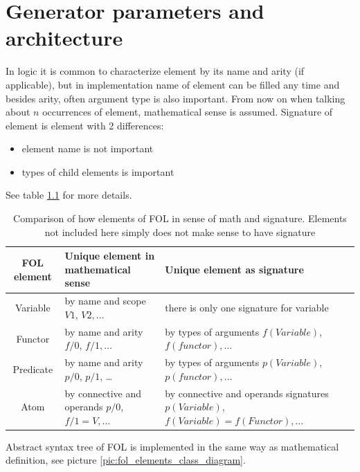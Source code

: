 \chapter{Generator parameters and architecture}

In logic it is common to characterize element by its name and arity (if applicable), but in implementation name of element can be filled any time and besides arity, often argument type is also important. From now on when talking about $n$ occurrences of element, mathematical sense is assumed. Signature of element is element with 2 differences:

\begin{itemize}
  \item element name is not important
  \item types of child elements is important 
\end{itemize}

See table \ref{tab:signatureComparison} for more details.

\begin{table}
  \centering
  \footnotesize
  \begin{tabularx}{\textwidth}{|c|X|X|}
    \hline
    FOL element & Unique element in mathematical sense & Unique element as signature \\
    \hline
    Variable & by name and scope $V1$, $V2, \dots$ & there is only one signature for variable \\  
    \hline
    Functor & by name and arity $f/0$, $f/1, \dots$ & by types of arguments $f(Variable)$, $f(functor), \dots$ \\
    \hline
    Predicate & by name and arity $p/0$, $p/1$, \dots & by types of arguments $p(Variable)$, $p(functor), \dots$ \\
    \hline
    Atom & by connective and operands $p/0$, $f/1 = V, \dots$ & by connective and operands signatures $p(Variable)$, $f(Variable) = f(Functor), \dots$ \\
    \hline
  \end{tabularx}
  \caption{Comparison of how elements of FOL in sense of math and signature. Elements not included here simply does not make sense to have signature}
  \label{tab:signatureComparison}
\end{table}

Abstract syntax tree of \gls{FOL} is implemented in the same way as mathematical definition, see picture \ref{pic:fol_elements_class_diagram}.


